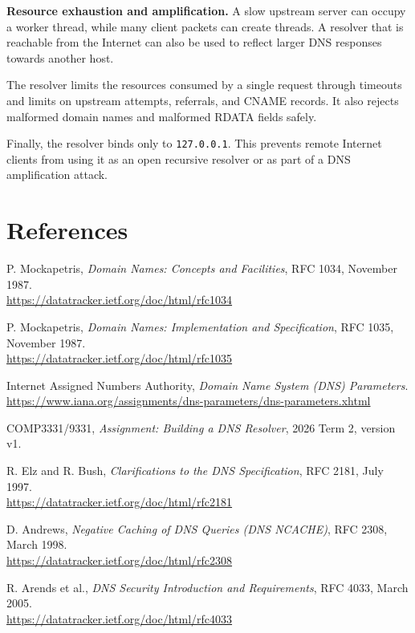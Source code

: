 \documentclass[11pt,a4paper]{article}
\newcommand{\code}[1]{\texttt{#1}}
\begin{document}
\textbf{Resource exhaustion and amplification.} A slow upstream server can
occupy a worker thread, while many client packets can create threads. A resolver
that is reachable from the Internet can also be used to reflect larger DNS
responses towards another host.

The resolver limits the resources consumed by a single request through
timeouts and limits on upstream attempts, referrals, and CNAME records. It also
rejects malformed domain names and malformed RDATA fields safely.

Finally, the resolver binds only to \code{127.0.0.1}. This prevents remote
Internet clients from using it as an open recursive resolver or as part of a DNS
amplification attack.

\section{References}

\begin{enumerate}[leftmargin=2em, label={[\arabic*]}, itemsep=0.8em]
    \item P. Mockapetris,
    \textit{Domain Names: Concepts and Facilities},
    RFC 1034, November 1987.\\
    \url{https://datatracker.ietf.org/doc/html/rfc1034}

    \item P. Mockapetris,
    \textit{Domain Names: Implementation and Specification},
    RFC 1035, November 1987.\\
    \url{https://datatracker.ietf.org/doc/html/rfc1035}

    \item Internet Assigned Numbers Authority,
    \textit{Domain Name System (DNS) Parameters}.\\
    \url{https://www.iana.org/assignments/dns-parameters/dns-parameters.xhtml}

    \item COMP3331/9331,
    \textit{Assignment: Building a DNS Resolver},
    2026 Term 2, version v1.

    \item R. Elz and R. Bush,
    \textit{Clarifications to the DNS Specification},
    RFC 2181, July 1997.\\
    \url{https://datatracker.ietf.org/doc/html/rfc2181}

    \item D. Andrews,
    \textit{Negative Caching of DNS Queries (DNS NCACHE)},
    RFC 2308, March 1998.\\
    \url{https://datatracker.ietf.org/doc/html/rfc2308}

    \item R. Arends et al.,
    \textit{DNS Security Introduction and Requirements},
    RFC 4033, March 2005.\\
    \url{https://datatracker.ietf.org/doc/html/rfc4033}
\end{enumerate}
\end{document}
